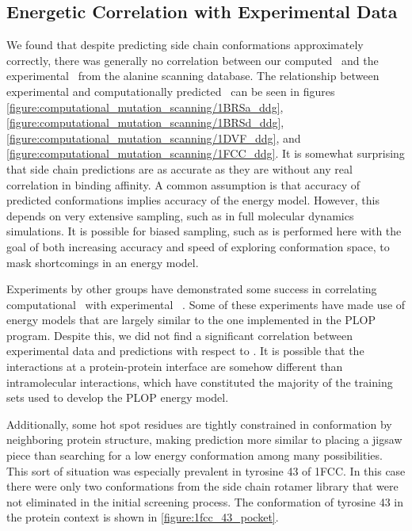\subsection{Energetic Correlation with Experimental Data}
\label{subsection:energetic_correlation_with_experimental_data}
We found that despite predicting side chain conformations approximately correctly, there was generally no correlation between our computed \ddg\ and the experimental \ddg\ from the alanine scanning database.
The relationship between experimental and computationally predicted \ddg\ can be seen in figures \ref{figure:computational_mutation_scanning/1BRSa_ddg}, \ref{figure:computational_mutation_scanning/1BRSd_ddg}, \ref{figure:computational_mutation_scanning/1DVF_ddg}, and \ref{figure:computational_mutation_scanning/1FCC_ddg}.
It is somewhat surprising that side chain predictions are as accurate as they are without any real correlation in binding affinity.
A common assumption is that accuracy of predicted conformations implies accuracy of the energy model.
However, this depends on very extensive sampling, such as in full molecular dynamics simulations.
It is possible for biased sampling, such as is performed here with the goal of both increasing accuracy and speed of exploring conformation space, to mask shortcomings in an energy model.

Experiments by other groups have demonstrated some success in correlating computational \ddg\ with experimental \ddg\ \cite{kortemme2004computational}.
Some of these experiments have made use of energy models that are largely similar to the one implemented in the PLOP program.
Despite this, we did not find a significant correlation between experimental data and predictions with respect to \ddg.
It is possible that the interactions at a protein-protein interface are somehow different than intramolecular interactions, which have constituted the majority of the training sets used to develop the PLOP energy model.

Additionally, some hot spot residues are tightly constrained in conformation by neighboring protein structure, making prediction more similar to placing a jigsaw piece than searching for a low energy conformation among many possibilities.
This sort of situation was especially prevalent in tyrosine 43 of 1FCC.
In this case there were only two conformations from the side chain rotamer library that were not eliminated in the initial screening process.
The conformation of tyrosine 43 in the protein context is shown in \ref{figure:1fcc_43_pocket}.


